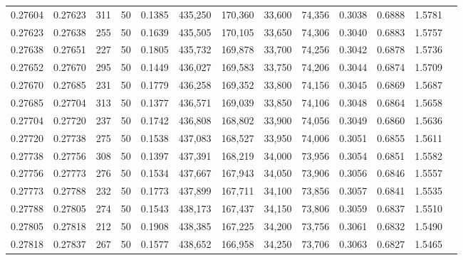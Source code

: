 \begin{tabular}{rrrrrrrrrrrrr}
0.27604 & 0.27623 &   311 &  50 &                                     0.1385 & 435,250 & 170,360 &  33,600 &  74,356 & 0.3038 & 0.6888 & 1.5781 \\
0.27623 & 0.27638 &   255 &  50 &                                     0.1639 & 435,505 & 170,105 &  33,650 &  74,306 & 0.3040 & 0.6883 & 1.5757 \\
0.27638 & 0.27651 &   227 &  50 &                                     0.1805 & 435,732 & 169,878 &  33,700 &  74,256 & 0.3042 & 0.6878 & 1.5736 \\
0.27652 & 0.27670 &   295 &  50 &                                     0.1449 & 436,027 & 169,583 &  33,750 &  74,206 & 0.3044 & 0.6874 & 1.5709 \\
0.27670 & 0.27685 &   231 &  50 &                                     0.1779 & 436,258 & 169,352 &  33,800 &  74,156 & 0.3045 & 0.6869 & 1.5687 \\
0.27685 & 0.27704 &   313 &  50 &                                     0.1377 & 436,571 & 169,039 &  33,850 &  74,106 & 0.3048 & 0.6864 & 1.5658 \\
0.27704 & 0.27720 &   237 &  50 &                                     0.1742 & 436,808 & 168,802 &  33,900 &  74,056 & 0.3049 & 0.6860 & 1.5636 \\
0.27720 & 0.27738 &   275 &  50 &                                     0.1538 & 437,083 & 168,527 &  33,950 &  74,006 & 0.3051 & 0.6855 & 1.5611 \\
0.27738 & 0.27756 &   308 &  50 &                                     0.1397 & 437,391 & 168,219 &  34,000 &  73,956 & 0.3054 & 0.6851 & 1.5582 \\
0.27756 & 0.27773 &   276 &  50 &                                     0.1534 & 437,667 & 167,943 &  34,050 &  73,906 & 0.3056 & 0.6846 & 1.5557 \\
0.27773 & 0.27788 &   232 &  50 &                                     0.1773 & 437,899 & 167,711 &  34,100 &  73,856 & 0.3057 & 0.6841 & 1.5535 \\
0.27788 & 0.27805 &   274 &  50 &                                     0.1543 & 438,173 & 167,437 &  34,150 &  73,806 & 0.3059 & 0.6837 & 1.5510 \\
0.27805 & 0.27818 &   212 &  50 &                                     0.1908 & 438,385 & 167,225 &  34,200 &  73,756 & 0.3061 & 0.6832 & 1.5490 \\
0.27818 & 0.27837 &   267 &  50 &                                     0.1577 & 438,652 & 166,958 &  34,250 &  73,706 & 0.3063 & 0.6827 & 1.5465 \\

\end{tabular}
